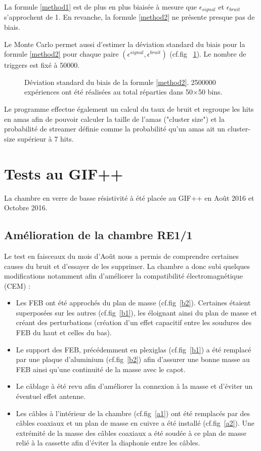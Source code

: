 La formule \ref{method1} est de plus en plus biaisée à mesure que $\epsilon_{signal}$ et $\epsilon_{bruit}$ s'approchent de \num {1}. En revanche, la formule \ref{method2} ne présente presque pas de biais.

Le Monte Carlo permet aussi d'estimer la déviation standard du biais pour la formule \ref{method2} pour chaque paire $\left(\epsilon^{signal},\epsilon^{bruit}\right)$ (cf.fig~ \ref{RMSmethod2}). Le nombre de triggers est fixé à \num{50000}.

\begin{figure}
	\centering
	\scalebox{0.75}{}
	\caption{Déviation standard du biais de la formule \ref{method2}. \num{2500000} expériences ont été réalisées au total réparties dans \num{50}$\times$\num{50} bins.}
	\label{RMSmethod2}
\end{figure}
\tikzexternalenable

Le programme effectue également un calcul du taux de bruit et regroupe les hits en amas afin de pouvoir calculer la taille de l'amas ("cluster size") et la probabilité de streamer définie comme la probabilité qu'un amas ait un cluster-size supérieur à 7 hits.

\section{Tests au GIF++}
La chambre en verre de basse résistivité à été placée au GIF++ en Août 2016 et Octobre 2016.

\subsection{Amélioration de la chambre RE1/1}
Le test en faisceaux du mois d'Août nous a permis de comprendre certaines causes du bruit et d'essayer de les supprimer.
La chambre a donc subi quelques modifications notamment afin d'améliorer la compatibilité électromagnétique (CEM) \cite{charoy2012comp}:

\begin{itemize}[label=$\bullet$]
	\item Les FEB ont été approchés du plan de masse (cf.fig~\ref{b2}). Certaines étaient superposées sur les autres (cf.fig~\ref{b1}), les éloignant ainsi du plan de masse et créant des perturbations (création d'un effet capacitif entre les soudures des FEB du haut et celles du bas).
	\item Le support des FEB, précédemment en plexiglas (cf.fig~\ref{b1}) a été remplacé par une plaque d'aluminium (cf.fig~\ref{b2}) afin d'assurer une bonne masse au FEB ainsi qu'une continuité de la masse avec le capot.
	\item Le câblage à été revu afin d'améliorer la connexion à la masse et d'éviter un éventuel effet antenne.
	\item Les câbles à l'intérieur de la chambre (cf.fig~\ref{a1}) ont été remplacés par des câbles coaxiaux et un plan de masse en cuivre a été installé (cf.fig~\ref{a2}). Une extrémité de la masse des câbles coaxiaux a été soudée à ce plan de masse relié à la cassette afin d'éviter la diaphonie entre les câbles.
\end{itemize}


